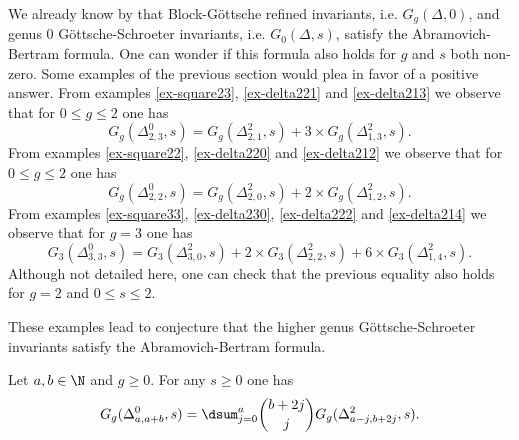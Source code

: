 We already know by \cite{bousseau_refined_2021} that Block-Göttsche refined invariants, i.e.  $G_g(\Delta,0)$, and genus $0$ Göttsche-Schroeter invariants, i.e.  $G_0(\Delta,s)$, satisfy the Abramovich-Bertram formula. One can wonder if this formula also holds for $g$ and $s$ both non-zero. Some examples of the previous section would plea in favor of a positive answer.
From examples \ref{ex-square23}, \ref{ex-delta221} and \ref{ex-delta213} we observe that for $0\leqslant g\leqslant 2$ one has
\[ G_g(\Delta^0_{2,3},s) = G_g(\Delta^2_{2,1},s) + 3\times G_g(\Delta^2_{1,3},s). \]
From examples \ref{ex-square22}, \ref{ex-delta220} and \ref{ex-delta212} we observe that for $0\leqslant g\leqslant 2$ one has
\[ G_g(\Delta^0_{2,2},s) = G_g(\Delta^2_{2,0},s) + 2\times G_g(\Delta^2_{1,2},s). \]
From examples \ref{ex-square33}, \ref{ex-delta230}, \ref{ex-delta222} and \ref{ex-delta214} we observe that for $g=3$ one has
\[ G_3(\Delta^0_{3,3},s) = G_3(\Delta^2_{3,0},s) + 2\times G_3(\Delta^2_{2,2},s) + 6\times G_3(\Delta^2_{1,4},s). \]
Although not detailed here, one can check that the previous equality also holds for $g=2$ and $0\leqslant s \leqslant 2$.

These examples lead to conjecture that the higher genus Göttsche-Schroeter invariants satisfy the Abramovich-Bertram formula.

\begin{conj} \label{conj-AB}
    Let $a,b \in\N$ and $g\geqslant 0$. For any $s\geqslant0$ one has
    \[ G_g(\Delta^0_{a,a+b},s) = \dsum_{j=0}^a \binom{b+2j}{j} G_g(\Delta^2_{a-j,b+2j},s).  \]
\end{conj}

